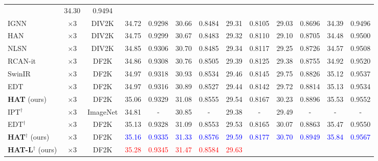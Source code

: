 \begin{table*}[!htbp]
\begin{center}
\begin{adjustbox}{width=\linewidth}
\begin{tabular}{|l|c|c|c|c|c|c|c|c|c|c|c|c|}
& {34.30}
& {0.9494}
\\
IGNN~\cite{zhou2020cross} & $\times$3 & DIV2K %
& {34.72}
& {0.9298}
& {30.66}
& {0.8484}
& {29.31}
& {0.8105}
& {29.03}
& {0.8696}
& {34.39}
& {0.9496}
\\
HAN~\cite{niu2020single}  & $\times$3 & DIV2K %
& {34.75}
& {0.9299}
& {30.67}
& {0.8483}
& {29.32}
& {0.8110}
& {29.10}
& {0.8705}
& {34.48}
& {0.9500}
\\
NLSN~\cite{mei2021image} & $\times$3 & DIV2K %
& 34.85 
& 0.9306 
& 30.70 
& 0.8485 
& 29.34 
& 0.8117 
& {29.25}
& {0.8726}
& 34.57 
& 0.9508  
\\
RCAN-it~\cite{DBLP:journals/corr/abs-2201-11279} & $\times$3 & DF2K %
& {34.86}
& {0.9308}
& {30.76}
& {0.8505}
& {29.39}
& {0.8125}
& {29.38}
& {0.8755}
& {34.92}
& {0.9520}
\\
SwinIR~\cite{DBLP:conf/iccvw/LiangCSZGT21} & $\times$3 & DF2K %
& 34.97
& 0.9318
& 30.93
& 0.8534
& 29.46
& 0.8145
& 29.75
& 0.8826
& 35.12
& 0.9537
\\
EDT~\cite{DBLP:journals/corr/abs-2112-10175} & $\times$3 & DF2K %
& 34.97
& 0.9316
& 30.89
& 0.8527
& 29.44
& 0.8142
& 29.72
& 0.8814
& 35.13
& 0.9534
\\
\textbf{HAT} (ours) & $\times$3 & DF2K %
& {35.06}
& {\color[HTML]{00BF01} 0.9329}
& {31.08}
& {\color[HTML]{00BF01} 0.8555}
& {\color[HTML]{00BF01} 29.54}
& {\color[HTML]{00BF01} 0.8167}
& {\color[HTML]{00BF01} 30.23}
& {\color[HTML]{00BF01} 0.8896}
& {\color[HTML]{00BF01} 35.53}
& {\color[HTML]{00BF01} 0.9552}
\\
\hdashline
IPT$^\dagger$~\cite{DBLP:conf/cvpr/Chen000DLMX0021} & $\times$3 & ImageNet %
& {34.81}
& {-}
& {30.85}
& {-}
& {29.38}
& {-}
& {29.49}
& {-}
& {-}
& {-}
\\
EDT$^\dagger$~\cite{DBLP:journals/corr/abs-2112-10175} & $\times$3 & DF2K %
& {\color[HTML]{00BF01} 35.13}
& 0.9328
& {\color[HTML]{00BF01} 31.09}
& 0.8553
& {29.53}
& {0.8165}
& 30.07
& 0.8863
& 35.47
& 0.9550
\\
\textbf{HAT}$^\dagger$ (ours) & $\times$3 & DF2K %
& \textcolor{blue}{35.16}
& \textcolor{blue}{0.9335}
& \textcolor{blue}{31.33}
& \textcolor{blue}{0.8576}
& \textcolor{blue}{29.59}
& \textcolor{blue}{0.8177}
& \textcolor{blue}{30.70}
& \textcolor{blue}{0.8949}
& \textcolor{blue}{35.84}
& \textcolor{blue}{0.9567}
\\
\textbf{HAT-L}$^\dagger$ (ours) & $\times$3 & DF2K %
& \textcolor{red}{35.28}
& \textcolor{red}{0.9345}
& \textcolor{red}{31.47}
& \textcolor{red}{0.8584}
& \textcolor{red}{29.63}

\end{tabular}
\end{adjustbox}
\end{center}
\end{table*}
